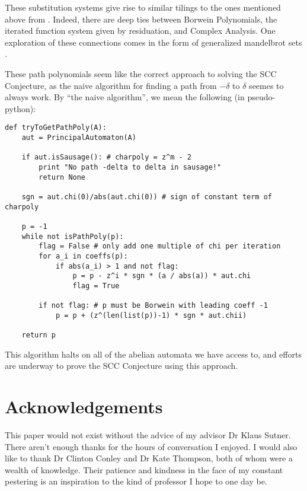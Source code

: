 \documentclass{article}
\newcommand{\2}{\textbf{2}}
\theoremstyle{definition}
\begin{document}
These substitution systems give rise to similar tilings to the ones 
mentioned above from \cite{LagariasWang96:tiles,LagariasWang97:integral_tiles}.
Indeed, there are deep ties between Borwein Polynomials, the iterated
function system given by residuation, and Complex Analysis. One exploration
of these connections comes in the form of generalized mandelbrot sets
\cite{Calegari2017:schottky-semigroups}.

These path polynomials seem like the correct approach to solving the SCC
Conjecture, as the naive algorithm for finding a path from $-\delta$ to
$\delta$ seemes to always work. By ``the naive algorithm'', we mean the 
following (in pseudo-python):

\begin{lstlisting}
def tryToGetPathPoly(A):
    aut = PrincipalAutomaton(A)

    if aut.isSausage(): # charpoly = z^m - 2
        print "No path -delta to delta in sausage!"
        return None

    sgn = aut.chi(0)/abs(aut.chi(0)) # sign of constant term of charpoly

    p = -1
    while not isPathPoly(p):
        flag = False # only add one multiple of chi per iteration
        for a_i in coeffs(p):
            if abs(a_i) > 1 and not flag:
                p = p - z^i * sgn * (a / abs(a)) * aut.chi
                flag = True

        if not flag: # p must be Borwein with leading coeff -1
            p = p + (z^(len(list(p))-1) * sgn * aut.chii)

    return p
\end{lstlisting}

This algorithm halts on all of the abelian automata we have access to, and
efforts are underway to prove the SCC Conjecture using this approach.

\section*{Acknowledgements}
This paper would not exist without the advice of my advisor 
Dr Klaus Sutner. There aren't enough thanks for the hours of 
conversation I enjoyed. I would also like to thank 
Dr Clinton Conley and Dr Kate Thompson, both of whom were a wealth of
knowledge. Their patience and kindness in the face of my constant 
pestering is an inspiration to the kind of professor I hope to one day be.

\newpage



\end{document}
